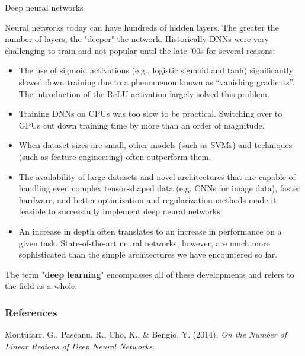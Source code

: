 \begin{vbframe}{Deep neural networks}

Neural networks today can have %
hundreds of hidden layers. The greater the number of layers, the "deeper" the network. Historically %
DNNs were very challenging to train and not popular until the late '00s for several reasons:
\lz
\begin{itemize}
\item %
The use of sigmoid activations (e.g., logistic sigmoid and tanh) significantly slowed down training due to a phenomenon known as \enquote{vanishing gradients}. The introduction of the ReLU activation largely solved this problem.
\item Training DNNs on CPUs was too slow to be practical. Switching over to GPUs cut down training time by more than an order of magnitude.
\item When dataset sizes are small, other models (such as SVMs) and techniques (such as feature engineering) often outperform them. 
\end{itemize}
\framebreak
\begin{itemize}
\item The availability of large datasets and novel architectures that are capable of handling even complex tensor-shaped data (e.g. CNNs for image data), faster hardware, and better optimization and regularization methods made it feasible to successfully implement deep neural networks.%
\lz

\item An increase in depth often translates to an increase in performance on a given task. State-of-the-art neural networks, however, are much more sophisticated than the simple architectures we have encountered so far.

\lz
\end{itemize}
The term "\textbf{deep learning}" encompasses all of these developments and refers to the field as a whole.
\end{vbframe}
\begin{vbframe}
\frametitle{References}
\footnotesize{
\begin{thebibliography}{99}
 Mont\'{u}farr, G., Pascanu, R., Cho, K., \& Bengio, Y. (2014). \textit{On the Number of Linear Regions of Deep Neural Networks}. 
\end{thebibliography}
}
\end{vbframe}
\endlecture
